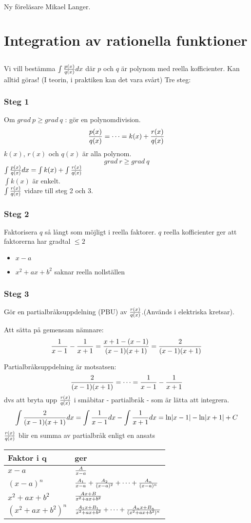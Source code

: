 \documentclass{article}
\newcommand{\xa}{x-a}
\newcommand{\xan}[1]{(\xa)^{#1}}
\newcommand{\xab}{x^2+ax+b^2}
\newcommand{\xabn}[1]{(\xab)^{#1}}
\begin{document}
Ny föreläsare Mikael Langer.
\section{Integration av rationella funktioner}
\subsection{}
Vi vill bestämma $\int{\frac{p(x)}{q(x)}dx}$ där $p$ och $q$ är polynom med reella kofficienter.
Kan alltid göras! (I teorin, i praktiken kan det vara svårt) Tre steg:

\subsubsection{Steg 1}
Om $grad\ p \ge grad\ q$ : gör en polynomdivision.
$$ \frac{p(x)}{q(x)} = \cdots = k(x) + \frac{r(x)}{q(x)}$$
$k(x)$, $r(x)$ och $q(x)$ är alla polynom.
$$grad\ r \ge grad\ q$$
$\int{\frac{p(x)}{q(x)}dx} = \int{k(x)}+\int{\frac{r(x)}{q(x)}}$\\
$\int{k(x)}$ är enkelt.\\
$\int{\frac{r(x)}{q(x)}}$ vidare till steg 2 och 3.

\subsubsection{Steg 2}
Faktorisera $q$ så långt som möjligt i reella faktorer.
$q$ reella kofficienter ger att faktorerna har gradtal $\le 2$
\begin{itemize}
    \item $\xa$
    \item $\xab$ saknar reella nollställen
\end{itemize}

\subsubsection{Steg 3}
Gör en partialbråksuppdelning (PBU) av $\frac{r(x)}{q(x)}$.(Används i elektriska kretsar).

Att sätta på gemensam nämnare:
$$ \frac{1}{x-1}-\frac{1}{x+1}=\frac{x+1-(x-1)}{(x-1)(x+1)}=\frac{2}{(x-1)(x+1)} $$

Partialbråksuppdelning är motsatsen:
$$ \frac{2}{(x-1)(x+1)}=\cdots= \frac{1}{x-1}-\frac{1}{x+1}$$
dvs att bryta upp $\frac{r(x)}{q(x)}$ i småbitar - partialbråk - som är lätta att integrera.
$$\int{\frac{2}{(x-1)(x+1)}dx} = \int{\frac{1}{x-1}dx} - \int{\frac{1}{x+1}dx} = \ln\lvert x-1\rvert - \ln\lvert x+1\rvert + C$$
$\frac{r(x)}{q(x)}$ blir en summa av partialbråk enligt en ansats

\begin{tabular}{ l l }
  Faktor i q & ger \\\hline
  $\xa$ & $\f{A}{\xa}$\\
  $\xan{n}$ & $\f{A_1}{\xa}+\f{A_2}{\xan{2}}+\cdots+\f{A_n}{\xan{n}}$\\
  $\xab$ & $\f{Ax+B}{\xab}$\\
  $\xabn{n}$ & $\f{A_1x+B_1}{\xab}+\cdots+\f{A_nx+B_n}{\xabn{n}}$\\
\end{tabular}
\end{document}
